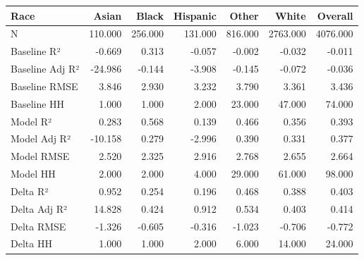 \begin{tabular}{lrrrrrr}
\toprule
Race &   Asian &   Black &  Hispanic &   Other &    White &  Overall \\
\midrule
N               & 110.000 & 256.000 &   131.000 & 816.000 & 2763.000 & 4076.000 \\
Baseline R²     &  -0.669 &   0.313 &    -0.057 &  -0.002 &   -0.032 &   -0.011 \\
Baseline Adj R² & -24.986 &  -0.144 &    -3.908 &  -0.145 &   -0.072 &   -0.036 \\
Baseline RMSE   &   3.846 &   2.930 &     3.232 &   3.790 &    3.361 &    3.436 \\
Baseline HH     &   1.000 &   1.000 &     2.000 &  23.000 &   47.000 &   74.000 \\
Model R²        &   0.283 &   0.568 &     0.139 &   0.466 &    0.356 &    0.393 \\
Model Adj R²    & -10.158 &   0.279 &    -2.996 &   0.390 &    0.331 &    0.377 \\
Model RMSE      &   2.520 &   2.325 &     2.916 &   2.768 &    2.655 &    2.664 \\
Model HH        &   2.000 &   2.000 &     4.000 &  29.000 &   61.000 &   98.000 \\
Delta R²        &   0.952 &   0.254 &     0.196 &   0.468 &    0.388 &    0.403 \\
Delta Adj R²    &  14.828 &   0.424 &     0.912 &   0.534 &    0.403 &    0.414 \\
Delta RMSE      &  -1.326 &  -0.605 &    -0.316 &  -1.023 &   -0.706 &   -0.772 \\
Delta HH        &   1.000 &   1.000 &     2.000 &   6.000 &   14.000 &   24.000 \\
\bottomrule
\end{tabular}
